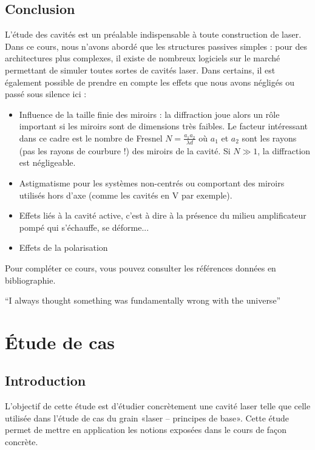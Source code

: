 \documentclass{book}
\begin{document}
\section{Conclusion}
L'étude des cavités est un préalable indispensable à toute construction de laser. Dans ce cours, nous n'avons abordé que les structures passives simples : pour des architectures plus complexes, il existe de nombreux logiciels sur le marché permettant de simuler toutes sortes de cavités laser. Dans certains, il est également possible de prendre en compte les effets que nous avons négligés ou passé sous silence ici :
\begin{itemize}[label=\textbullet]
    \item Influence de la taille finie des miroirs : la diffraction joue alors un rôle important si les miroirs sont de dimensions très faibles. Le facteur intéressant dans ce cadre est le nombre de Fresnel $N=\frac{a_1a_2}{\lambda d}$ où $a_1$ et $a_2$ sont les rayons (pas les rayons de courbure !) des miroirs de la cavité. Si $N \gg 1$, la diffraction est négligeable.
    \item Astigmatisme pour les systèmes non-centrés ou comportant des miroirs utilisés hors d'axe (comme les cavités en V par exemple).
    \item Effets liés à la cavité active, c'est à dire à la présence du milieu amplificateur pompé qui s'échauffe, se déforme...
    \item Effets de la polarisation
\end{itemize}

Pour compléter ce cours, vous pouvez consulter les références données en bibliographie.
    
``I always thought something was fundamentally wrong with the universe'' \citep{adams1995hitchhiker} \citep{anthoTropCho} \citep{herwigLaser} \citep{laguerreDesEtoiles}

\chapter{Étude de cas}
\section{Introduction}

L'objectif de cette étude est d'étudier concrètement une cavité laser telle que celle utilisée dans l'étude de cas du grain «laser – principes de base». Cette étude permet de mettre en application les notions exposées dans le cours de façon concrète.
\end{document}
